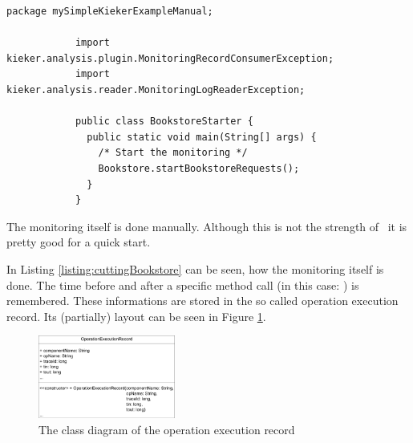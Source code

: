 		\begin{lstlisting}[caption=BookstoreStarter.java] 
			package mySimpleKiekerExampleManual;

			import kieker.analysis.plugin.MonitoringRecordConsumerException; 
			import kieker.analysis.reader.MonitoringLogReaderException;

			public class BookstoreStarter { 
			  public static void main(String[] args) { 
				/* Start the monitoring */ 
				Bookstore.startBookstoreRequests(); 
			  }
			} 
		\end{lstlisting}

		

		

		The monitoring itself is done manually. Although this is not the strength of \Kieker\ it is pretty good for a quick start. 

		
		
		In Listing \ref{listing:cuttingBookstore}  can be seen, how the monitoring itself is done. The time before and after a specific method call (in this case: ) is remembered. These informations are stored in the so called operation execution record. Its (partially) layout can be seen in Figure \ref{Figure:OperationExecutionRecordClassDiagram}.

		\begin{figure}[H]
			\begin{centering}
				\includegraphics[width=0.4\textwidth]{images/OpExRecClassDiagram}
				\caption{The class diagram of the operation execution record}
				\label{Figure:OperationExecutionRecordClassDiagram}
			\end{centering}
		\end{figure}

